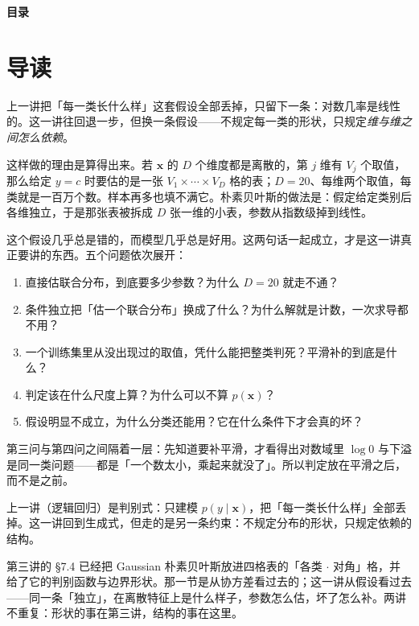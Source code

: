 \documentclass[11pt,a4paper,fontset=windows,zihao=-4]{ctexart}
\makeatletter
\newcommand{\bx}{\mathbf{x}}
\renewcommand{\tableofcontents}{%
  \par\begingroup
    \sffamily\Large\bfseries\color{navy}目\quad 录\par
  \endgroup
  \vspace{0.85em}
  \setlength{\parskip}{0pt}%
  \@starttoc{toc}%
}
\makeatother
\begin{document}
\setcounter{page}{1}

\tableofcontents
\thispagestyle{plain}
\clearpage

\setcounter{page}{1}

\section*{导\quad 读}

上一讲把「每一类长什么样」这套假设全部丢掉，只留下一条：对数几率是线性的。这一讲往回退一步，但换一条假设——不规定每一类的形状，只规定\emph{维与维之间怎么依赖}。

这样做的理由是算得出来。若 $\bx$ 的 $D$ 个维度都是离散的，第 $j$ 维有 $V_j$ 个取值，那么给定 $y=c$ 时要估的是一张 $V_1\times\cdots\times V_D$ 格的表；$D=20$、每维两个取值，每类就是一百万个数。样本再多也填不满它。朴素贝叶斯的做法是：假定给定类别后各维独立，于是那张表被拆成 $D$ 张一维的小表，参数从指数级掉到线性。

这个假设几乎总是错的，而模型几乎总是好用。这两句话一起成立，才是这一讲真正要讲的东西。五个问题依次展开：

\begin{enumerate}[label=\textcolor{navy}{\bfseries(\arabic*)},leftmargin=2.4em]
  \item 直接估联合分布，到底要多少参数？为什么 $D=20$ 就走不通？
  \item 条件独立把「估一个联合分布」换成了什么？为什么解就是计数，一次求导都不用？
  \item 一个训练集里从没出现过的取值，凭什么能把整类判死？平滑补的到底是什么？
  \item 判定该在什么尺度上算？为什么可以不算 $p(\bx)$？
  \item 假设明显不成立，为什么分类还能用？它在什么条件下才会真的坏？
\end{enumerate}

第三问与第四问之间隔着一层：先知道要补平滑，才看得出对数域里 $\log 0$ 与下溢是同一类问题——都是「一个数太小，乘起来就没了」。所以判定放在平滑之后，而不是之前。

\begin{add}[在分类链上的位置]
上一讲（逻辑回归）是判别式：只建模 $p(y\mid\bx)$，把「每一类长什么样」全部丢掉。这一讲回到生成式，但走的是另一条约束：不规定分布的形状，只规定依赖的结构。

第三讲的 §7.4 已经把 Gaussian 朴素贝叶斯放进四格表的「各类 $\cdot$ 对角」格，并给了它的判别函数与边界形状。那一节是从协方差看过去的；这一讲从假设看过去——同一条「独立」，在离散特征上是什么样子，参数怎么估，坏了怎么补。两讲不重复：形状的事在第三讲，结构的事在这里。
\end{add}
\end{document}

